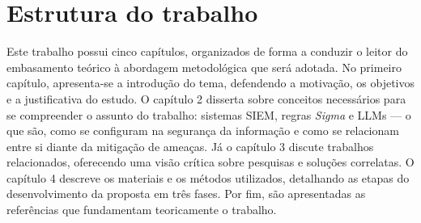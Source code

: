 
\section{Estrutura do trabalho}\label{sec:estruturaTrabalho}

Este trabalho possui cinco capítulos, organizados de forma a conduzir o leitor do embasamento teórico à abordagem metodológica que será adotada. No primeiro capítulo, apresenta-se a introdução do tema, defendendo a motivação, os objetivos e a justificativa do estudo. 
O capítulo 2 disserta sobre conceitos necessários para se compreender o assunto do trabalho: sistemas SIEM, regras \textit{Sigma} e LLMs --- o que são, como se configuram na segurança da informação e como se relacionam entre si diante da mitigação de ameaças.
Já o capítulo 3 discute trabalhos relacionados, oferecendo uma visão crítica sobre pesquisas e soluções correlatas. 
O capítulo 4 descreve os materiais e os métodos utilizados, detalhando as etapas do desenvolvimento da proposta em três fases. 
Por fim, são apresentadas as referências que fundamentam teoricamente o trabalho.


